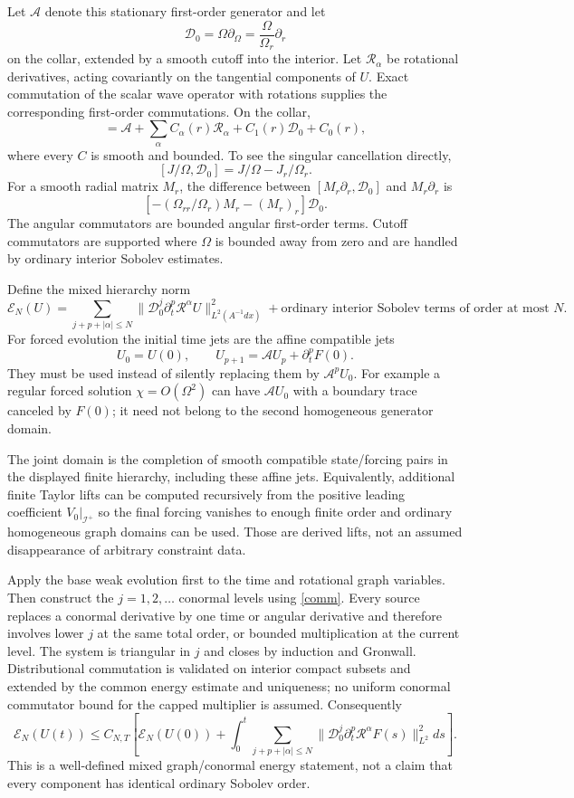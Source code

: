 \documentclass[11pt]{article}
\newcommand{\scri}{\mathscr I^+}
\begin{document}
Let $\mathcal A$ denote this stationary first-order generator and let
\[
 \mathcal D_0=\Omega\partial_\Omega=\frac{\Omega}{\Omega_r}\partial_r
\]
on the collar, extended by a smooth cutoff into the interior. Let $\mathcal R_\alpha$ be rotational derivatives, acting covariantly on the tangential components of $U$. Exact commutation of the scalar wave operator with rotations supplies the corresponding first-order commutations. On the collar,
\begin{equation}
 [\mathcal A,\mathcal D_0]
 =\mathcal A+\sum_\alpha C_\alpha(r)\mathcal R_\alpha
 +C_1(r)\mathcal D_0+C_0(r),\label{comm}
\end{equation}
where every $C$ is smooth and bounded. To see the singular cancellation directly,
\[
 [J/\Omega,\mathcal D_0]=J/\Omega-J_r/\Omega_r.
\]
For a smooth radial matrix $M_r$, the difference between
$[M_r\partial_r,\mathcal D_0]$ and $M_r\partial_r$ is
\[
 \left[-(\Omega_{rr}/\Omega_r)M_r-(M_r)_r\right]\mathcal D_0.
\]
The angular commutators are bounded angular first-order terms. Cutoff commutators are supported where $\Omega$ is bounded away from zero and are handled by ordinary interior Sobolev estimates.

Define the mixed hierarchy norm
\[
 \mathcal E_N(U)=
 \sum_{j+p+|\alpha|\le N}
 \|\mathcal D_0^j\partial_t^p\mathcal R^\alpha U\|_{L^2(A^{-1}dx)}^2
 +\text{ordinary interior Sobolev terms of order at most }N.
\]
For forced evolution the initial time jets are the affine compatible jets
\[
 U_0=U(0),\qquad U_{p+1}=\mathcal A U_p+\partial_t^pF(0).
\]
They must be used instead of silently replacing them by $\mathcal A^pU_0$. For example a regular forced solution $\chi=O(\Omega^2)$ can have $\mathcal AU_0$ with a boundary trace canceled by $F(0)$; it need not belong to the second homogeneous generator domain.

The joint domain is the completion of smooth compatible state/forcing pairs in the displayed finite hierarchy, including these affine jets. Equivalently, additional finite Taylor lifts can be computed recursively from the positive leading coefficient $V_0|_{\scri}$ so the final forcing vanishes to enough finite order and ordinary homogeneous graph domains can be used. Those are derived lifts, not an assumed disappearance of arbitrary constraint data.

Apply the base weak evolution first to the time and rotational graph variables. Then construct the $j=1,2,\ldots$ conormal levels using \eqref{comm}. Every source replaces a conormal derivative by one time or angular derivative and therefore involves lower $j$ at the same total order, or bounded multiplication at the current level. The system is triangular in $j$ and closes by induction and Gronwall. Distributional commutation is validated on interior compact subsets and extended by the common energy estimate and uniqueness; no uniform conormal commutator bound for the capped multiplier is assumed. Consequently
\[
 \mathcal E_N(U(t))\le C_{N,T}\left[
 \mathcal E_N(U(0))+
 \int_0^t\sum_{j+p+|\alpha|\le N}
 \|\mathcal D_0^j\partial_t^p\mathcal R^\alpha F(s)\|_{L^2}^2ds
 \right].
\]
This is a well-defined mixed graph/conormal energy statement, not a claim that every component has identical ordinary Sobolev order.
\end{document}
